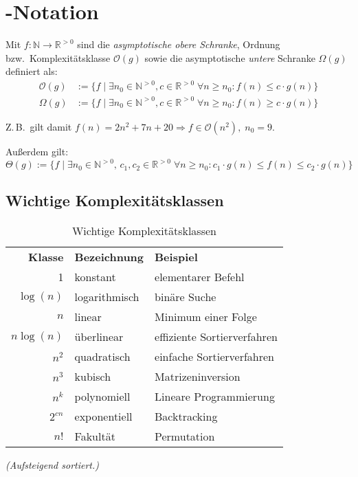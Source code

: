 \section{\protect{}-Notation}
Mit $f : \mathbb{N} \to \mathbb{R}^{>0}$ sind die \emph{asymptotische obere Schranke}, Ordnung bzw.~Komplexitätsklasse $\mathcal{O}(g)$ sowie die asymptotische \emph{untere} Schranke $\Omega(g)$ definiert als:
\begin{align*}
  \mathcal{O}(g) & := \bigl\lbrace f \mid \exists n_0 \in \mathbb{N}^{>0}, c \in \mathbb{R}^{>0} \; \forall n \geq n_0 : f(n)\leq c\cdot g(n) \bigr\rbrace \\
  \Omega(g) & := \bigl\lbrace f \mid \exists n_0 \in \mathbb{N}^{>0}, c \in \mathbb{R}^{>0} \; \forall n \geq n_0 : f(n)\geq c\cdot g(n) \bigr\rbrace
\end{align*}

Z.\,B.~gilt damit $f(n) = 2n^2 + 7n + 20 \Rightarrow f \in \mathcal{O}(n^2),\; n_0 = 9$.

Außerdem gilt:
\[
  \varTheta(g) := \bigl\lbrace f \mid \exists n_0 \in \mathbb{N}^{>0},\, c_1,c_2 \in \mathbb{R}^{>0} \; \forall n \geq n_0 : c_1\cdot g(n) \leq f(n) \leq c_2\cdot g(n) \bigr\rbrace
\]

\subsection{Wichtige Komplexitätsklassen}
\begin{table}[htb]
\centering\begin{tabular}{rll}
	\bfseries Klasse & \bfseries Bezeichnung & \bfseries Beispiel          \\
	               1 & konstant              & elementarer Befehl          \\
	       $\log(n)$ & logarithmisch         & binäre Suche                \\
	             $n$ & linear                & Minimum einer Folge         \\
	      $n\log(n)$ & überlinear            & effiziente Sortierverfahren \\
	           $n^2$ & quadratisch           & einfache Sortierverfahren   \\
	           $n^3$ & kubisch               & Matrizeninversion           \\
	           $n^k$ & polynomiell           & Lineare Programmierung      \\
	        $2^{cn}$ & exponentiell          & Backtracking                \\
	            $n!$ & Fakultät              & Permutation
\end{tabular}
\begin{center}\textit{(Aufsteigend sortiert.)}\end{center}

\caption{Wichtige Komplexitätsklassen}
\end{table}

